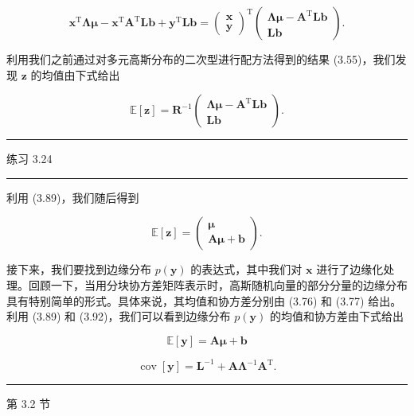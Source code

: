 \documentclass[10pt]{article}
\newcommand{\HRule}{\begin{center}\rule{0.9\linewidth}{0.2mm}\end{center}}
\begin{document}
\[
{\mathbf{x}}^{\mathrm{T}}\mathbf{\Lambda }\mathbf{\mu } - {\mathbf{x}}^{\mathrm{T}}{\mathbf{A}}^{\mathrm{T}}\mathbf{L}\mathbf{b} + {\mathbf{y}}^{\mathrm{T}}\mathbf{L}\mathbf{b} = {\left( \begin{array}{l} \mathbf{x} \\  \mathbf{y} \end{array}\right) }^{\mathrm{T}}\left( \begin{matrix} \mathbf{\Lambda }\mathbf{\mu } - {\mathbf{A}}^{\mathrm{T}}\mathbf{L}\mathbf{b} \\  \mathbf{L}\mathbf{b} \end{matrix}\right) . \tag{3.90}
\]

利用我们之前通过对多元高斯分布的二次型进行配方法得到的结果 (3.55)，我们发现 \(\mathbf{z}\) 的均值由下式给出

\[
\mathbb{E}\left\lbrack  \mathbf{z}\right\rbrack   = {\mathbf{R}}^{-1}\left( \begin{matrix} \mathbf{\Lambda }\mathbf{\mu } - {\mathbf{A}}^{\mathrm{T}}\mathbf{L}\mathbf{b} \\  \mathbf{L}\mathbf{b} \end{matrix}\right) . \tag{3.91}
\]

\HRule

练习 3.24

\HRule

利用 (3.89)，我们随后得到

\[
\mathbb{E}\left\lbrack  \mathbf{z}\right\rbrack   = \left( \begin{matrix} \mathbf{\mu } \\  \mathbf{A}\mathbf{\mu } + \mathbf{b} \end{matrix}\right) . \tag{3.92}
\]

接下来，我们要找到边缘分布 \(p\left( \mathbf{y}\right)\) 的表达式，其中我们对 \(\mathbf{x}\) 进行了边缘化处理。回顾一下，当用分块协方差矩阵表示时，高斯随机向量的部分分量的边缘分布具有特别简单的形式。具体来说，其均值和协方差分别由 (3.76) 和 (3.77) 给出。利用 (3.89) 和 (3.92)，我们可以看到边缘分布 \(p\left( \mathbf{y}\right)\) 的均值和协方差由下式给出

\[
\mathbb{E}\left\lbrack  \mathbf{y}\right\rbrack   = \mathbf{A}\mathbf{\mu } + \mathbf{b} \tag{3.93}
\]

\[
\operatorname{cov}\left\lbrack  \mathbf{y}\right\rbrack   = {\mathbf{L}}^{-1} + \mathbf{A}{\mathbf{\Lambda }}^{-1}{\mathbf{A}}^{\mathrm{T}}. \tag{3.94}
\]

\HRule

第 3.2 节
\end{document}
